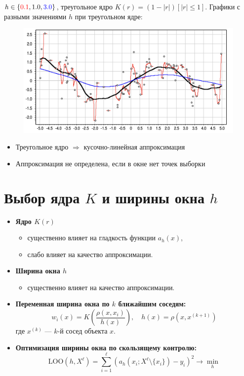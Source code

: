 \noindent
\(h \in \{\textcolor{red}{0.1}, 1.0, \textcolor{blue}{3.0}\}\), треугольное ядро \(K(r) = (1 - \lvert r \rvert) [{\lvert r \rvert \leq 1}]\). Графики с разными значениями \(h\) при треугольном ядре:
\begin{figure}[ht]
    \centering
    \includegraphics[width=\textwidth]{chapters/metric/images/I3.png}
    \label{fig:kernel_triangle-1}
\end{figure}

\begin{itemize}
    \item Треугольное ядро \(\Rightarrow\) кусочно-линейная аппроксимация
    \item Аппроксимация не определена, если в окне нет точек выборки
\end{itemize}

\section*{Выбор ядра \(K\) и ширины окна \(h\)}

\begin{itemize}
    \item \textbf{Ядро \(K(r)\)}
    \begin{itemize}
        \item существенно влияет на гладкость функции \( a_h(x) \),
        \item слабо влияет на качество аппроксимации.
    \end{itemize}
    \item \textbf{Ширина окна \(h\)}
    \begin{itemize}
        \item существенно влияет на качество аппроксимации.
    \end{itemize}
    \item \textbf{Переменная ширина окна по \(k\) ближайшим соседям:}
    \[
    w_i(x) = K\left( \frac{\rho(x, x_i)}{h(x)} \right), \quad h(x) = \rho(x, x^{(k+1)})
    \]
    где \(x^{(k)}\) — \(k\)-й сосед объекта \(x\).

    \item \textbf{Оптимизация ширины окна по скользящему контролю:}
    \[
    \text{LOO}(h, X^\ell) = \sum_{i=1}^\ell \left( a_h(x_i; X^\ell \setminus \{x_i\}) - y_i \right)^2 \to \min_h
    \]
\end{itemize}

